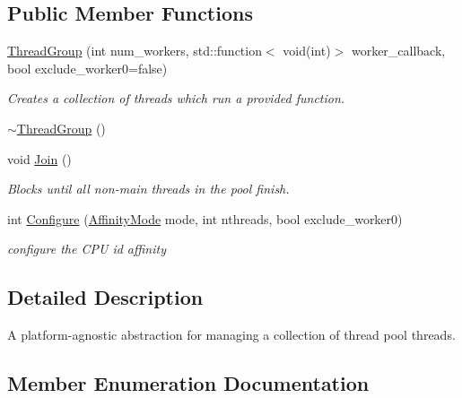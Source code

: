 \subsection*{Public Member Functions}
\begin{DoxyCompactItemize}
\item 
\hyperlink{classtvm_1_1runtime_1_1threading_1_1ThreadGroup_ac5d6f6fc93271e3627201be7cfcde287}{Thread\+Group} (int num\+\_\+workers, std\+::function$<$ void(int)$>$ worker\+\_\+callback, bool exclude\+\_\+worker0=false)
\begin{DoxyCompactList}\small\item\em Creates a collection of threads which run a provided function. \end{DoxyCompactList}\item 
\hyperlink{classtvm_1_1runtime_1_1threading_1_1ThreadGroup_aa4342f9c75798111f6354a7806c93254}{$\sim$\+Thread\+Group} ()
\item 
void \hyperlink{classtvm_1_1runtime_1_1threading_1_1ThreadGroup_a17a569bc69432bccea02d0cc554ff385}{Join} ()
\begin{DoxyCompactList}\small\item\em Blocks until all non-\/main threads in the pool finish. \end{DoxyCompactList}\item 
int \hyperlink{classtvm_1_1runtime_1_1threading_1_1ThreadGroup_a458a6479c996dcdfa994ae1231f4635a}{Configure} (\hyperlink{classtvm_1_1runtime_1_1threading_1_1ThreadGroup_a5230a4c2d7f6c2f73f3d5fb00e9f6acd}{Affinity\+Mode} mode, int nthreads, bool exclude\+\_\+worker0)
\begin{DoxyCompactList}\small\item\em configure the C\+PU id affinity \end{DoxyCompactList}\end{DoxyCompactItemize}


\subsection{Detailed Description}
A platform-\/agnostic abstraction for managing a collection of thread pool threads. 

\subsection{Member Enumeration Documentation}
